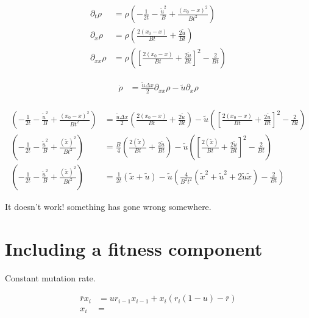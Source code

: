 \documentclass[a4paper]{article}
\begin{document}
\begin{align*}
\partial _t \rho & = \rho \left( - \frac{1}{2t} - \frac{\tilde{u} ^2}{B} + \frac{(x_0 - x)^2}{Bt^2} \right) \\
\partial _x \rho & = \rho \left( \frac{2(x_0 -x )}{Bt} + \frac{2 \tilde{u}}{Bt} \right) \\
\partial_{xx} \rho & = \rho \left( \left[ \frac{2(x_0 -x )}{Bt} + \frac{2 \tilde{u}}{Bt} \right] ^2 - \frac{2}{Bt} \right)
\end{align*}

\begin{align*}
\dot{\rho} & = \frac{\tilde{u} \Delta x}{2} \partial _{xx} \rho - \tilde{u} \partial _x \rho \\
\end{align*}

\begin{align*}
\left( - \frac{1}{2t} - \frac{\tilde{u} ^2}{B} + \frac{(x_0 - x)^2}{Bt^2} \right) & = \frac{\tilde{u} \Delta x}{2} \left( \frac{2(x_0 -x )}{Bt} + \frac{2 \tilde{u}}{Bt} \right) - \tilde{u} \left( \left[ \frac{2(x_0 -x )}{Bt} + \frac{2 \tilde{u}}{Bt} \right] ^2 - \frac{2}{Bt} \right) \\
\left( - \frac{1}{2t} - \frac{\tilde{u} ^2}{B} + \frac{(\tilde{x})^2}{Bt^2} \right) & = \frac{B}{4} \left( \frac{2(\tilde{x})}{Bt} + \frac{2 \tilde{u}}{Bt} \right) - \tilde{u} \left( \left[ \frac{2(\tilde{x} )}{Bt} + \frac{2 \tilde{u}}{Bt} \right] ^2 - \frac{2}{Bt} \right) \\
\left( - \frac{1}{2t} - \frac{\tilde{u} ^2}{B} + \frac{(\tilde{x})^2}{Bt^2} \right) & = \frac{1}{2t} (\tilde{x} + \tilde{u} ) - \tilde{u} \left( \frac{4}{B^2 t^2}( \tilde{x} ^2 + \tilde{u}^2 + 2 \tilde{u} \tilde{x} ) - \frac{2}{Bt} \right)
\end{align*}

It doesn't work! something has gone wrong somewhere. 

\section*{Including a fitness component}

Constant mutation rate. 

\begin{align*}
\bar{r} x_i & = u r_{i-1} x_{i-1} + x_i ( r_i ( 1 - u ) - \bar{r} ) \\
x_i & =  
\end{align*}
\end{document}
